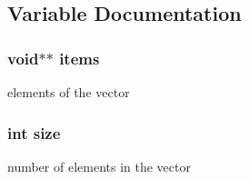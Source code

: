 \subsection{Variable Documentation}
\hypertarget{group__vector_ga94977134c19c2c536550e6b13d69218d}{}
\subsubsection[{items}]{\setlength{\rightskip}{0pt plus 5cm}void$\ast$$\ast$ items}\label{group__vector_ga94977134c19c2c536550e6b13d69218d}
elements of the vector \hypertarget{group__vector_ga439227feff9d7f55384e8780cfc2eb82}{}
\subsubsection[{size}]{\setlength{\rightskip}{0pt plus 5cm}int size}\label{group__vector_ga439227feff9d7f55384e8780cfc2eb82}
number of elements in the vector 